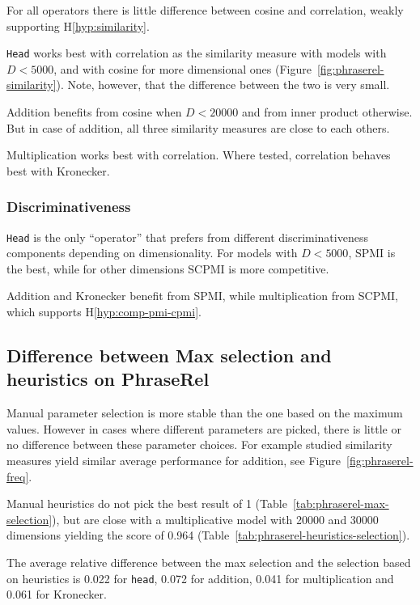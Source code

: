 For all operators there is little difference between cosine and correlation, weakly supporting H\ref{hyp:similarity}.

\texttt{Head} works best with correlation as the similarity measure with models with $D < 5000$, and with cosine for more dimensional ones (Figure~\ref{fig:phraserel-similarity}). Note, however, that the difference between the two is very small.

Addition benefits from cosine when $D < 20000$ and from inner product otherwise. But in case of addition, all three similarity measures are close to each others.

Multiplication works best with correlation. Where tested, correlation behaves best with Kronecker.

\subsubsection{Discriminativeness}
\label{sec:discriminativeness-phraserel}



\texttt{Head} is the only ``operator'' that prefers from different discriminativeness components depending on dimensionality. For models with $D < 5000$, SPMI is the best, while for other dimensions SCPMI is more competitive.

Addition and Kronecker benefit from SPMI, while multiplication from SCPMI, which supports H\ref{hyp:comp-pmi-cpmi}.

\subsection{Difference between Max selection and heuristics on PhraseRel}
\label{sec:diff-phraserel}

Manual parameter selection is more stable than the one based on the maximum values. However in cases where different parameters are picked, there is little or no difference between these parameter choices. For example studied similarity measures yield similar average performance for addition, see Figure~\ref{fig:phraserel-freq}.

Manual heuristics do not pick the best result of 1 (Table~\ref{tab:phraserel-max-selection}), but are close with a multiplicative model with 20000 and 30000 dimensions yielding the score of 0.964 (Table~\ref{tab:phraserel-heuristics-selection}).

The average relative difference between the max selection and the selection based on heuristics is 0.022 for \texttt{head}, 0.072 for addition, 0.041 for multiplication and 0.061 for Kronecker.

